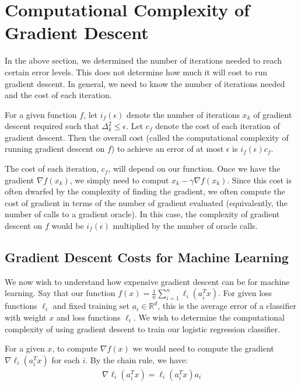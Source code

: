 \documentclass[12pt]{report}
\def\real{\mathbb R}
\begin{document}
\section{Computational Complexity of Gradient Descent}

In the above section, we determined the number of iterations needed to reach certain error levels. This does not determine how much it will cost to run gradient descent. In general, we need to know the number of iterations needed and the cost of each iteration.

\medskip

For a given function $f$, let $i_f(\epsilon)$ denote the number of iterations $x_k$ of gradient descent required such that $\Delta_k^2 \leq \epsilon$. Let $c_f$ denote the cost of each iteration of gradient descent. Then the overall cost (called the computational complexity of running gradient descent on $f$) to achieve an error of at most $\epsilon$ is $i_f(\epsilon)c_f$.

\medskip

The cost of each iteration, $c_f$, will depend on our function. Once we have the gradient $\nabla f(x_k)$, we simply need to comput $x_k - \gamma \nabla f(x_k)$. Since this cost is often dwarfed by the complexity of finding the gradient, we often compute the cost of gradient in terms of the number of gradient evaluated (equivalently, the number of calls to a gradient oracle). In this case, the complexity of gradient descent on $f$ would be $i_f(\epsilon)$ multiplied by the number of oracle calls.

\subsection{Gradient Descent Costs for Machine Learning}

We now wish to understand how expensive gradient descent can be for machine learning. Say that our function $f(x) = \frac{1}{n}\sum_{i=1}^n \ell_i(a_i^Tx)$. For given loss functions $\ell_i$ and fixed training set $a_i \in \real^d$, this is the average error of a classifier with weight $x$ and loss functions $\ell_i$. We wish to determine the computational complexity of using gradient descent to train our logistic regression classifier.

For a given $x$, to compute $\nabla f(x)$ we would need to compute the gradient $\nabla \ell_i(a_i^Tx)$ for each $i$. By the chain rule, we have:
\begin{align*}
\nabla \ell_i (a_i^Tx) = \ell_i(a_i^Tx)a_i\end{align*}
\end{document}
